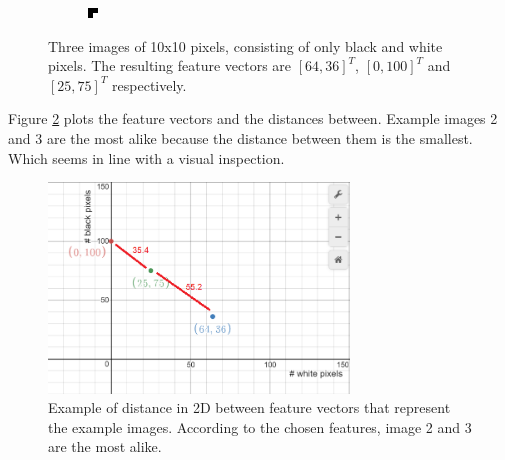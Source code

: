 \documentclass{article}
\begin{document}
\begin{figure}[H]
\begin{subfigure}[b]{0.2\textwidth}
	\end{subfigure}\hfill
	\begin{subfigure}[b]{0.2\textwidth}
		\includegraphics[width=\textwidth]{images/mostlyblack.png}
	\end{subfigure}
	\caption{Three images of 10x10 pixels, consisting of only black and white pixels. The resulting feature vectors are $[64,36]^T$, $[0, 100]^T$ and $[25,75]^T$ respectively.}
	\label{featurevectorimages}
\end{figure}

Figure \ref{fig:distanceexample} plots the feature vectors and the distances between. Example images 2 and 3 are the most alike because the distance between them is the smallest. Which seems in line with a visual inspection.

\begin{figure}[H]
	\includegraphics[width=8cm]{images/distanceexample.png}
	\centering
	\caption{Example of distance in 2D between feature vectors that represent the example images. According to the chosen features, image 2 and 3 are the most alike.}
	\label{fig:distanceexample}
\end{figure}
\end{document}
